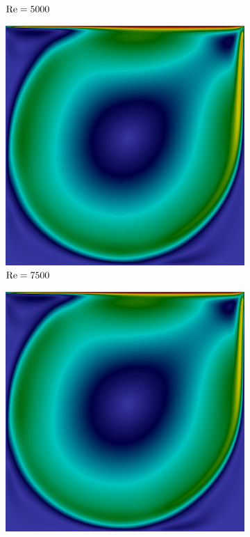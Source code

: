\begin{figure}[h]
\begin{subfigure}{0.32\textwidth}
    \caption{$\mathrm{Re}=5000$}
    \end{subfigure}
    \begin{subfigure}{0.32\textwidth}
    \includegraphics[width=\linewidth]{Figuras/Cavity/Re7500.png}
    \caption{$\mathrm{Re}=7500$}
    \end{subfigure}
    \begin{subfigure}{0.32\textwidth}
    \includegraphics[width=\linewidth]{Figuras/Cavity/Re10000.png}

\end{subfigure}
\end{figure}
